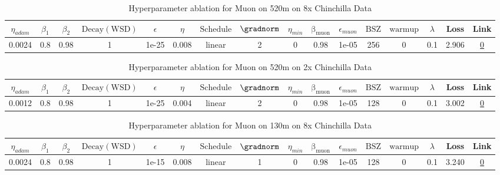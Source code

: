\begin{table}[H]
\centering
\caption{Hyperparameter ablation for Muon on 520m on 8x Chinchilla Data}
\label{tab:ablation_muon_520m_8}
\begin{tabular}{cccccccccccccccc}
\toprule
$\eta_{adam}$ & $\beta_1$ & $\beta_2$ & $\mathrm{Decay (WSD)}$ & $\epsilon$ & $\eta$ & $\mathrm{Schedule}$ & $\gradnorm$ & $\eta_{min}$ & $\mathrm{\beta_{muon}}$ & $\epsilon_{muon}$ & $\mathrm{BSZ}$ & $\mathrm{warmup}$ & $\lambda$ & Loss & Link \\
\midrule
0.0024 & 0.8 & 0.98 & 1 & 1e-25 & 0.008 & linear & 2 & 0 & 0.98 & 1e-05 & 256 & 0 & 0.1 & 2.906 & \href{https://wandb.ai/stanford-mercury/optimizer-scaling/runs/sweep-520m-85B-muongc58c06lr0.008-wd0.1-minlr0-warmup0-b10.8-b20-498482}{0} \\
\midrule
\bottomrule
\end{tabular}
\end{table}

\begin{table}[H]
\centering
\caption{Hyperparameter ablation for Muon on 520m on 2x Chinchilla Data}
\label{tab:ablation_muon_520m_2}
\begin{tabular}{cccccccccccccccc}
\toprule
$\eta_{adam}$ & $\beta_1$ & $\beta_2$ & $\mathrm{Decay (WSD)}$ & $\epsilon$ & $\eta$ & $\mathrm{Schedule}$ & $\gradnorm$ & $\eta_{min}$ & $\mathrm{\beta_{muon}}$ & $\epsilon_{muon}$ & $\mathrm{BSZ}$ & $\mathrm{warmup}$ & $\lambda$ & Loss & Link \\
\midrule
0.0012 & 0.8 & 0.98 & 1 & 1e-25 & 0.004 & linear & 2 & 0 & 0.98 & 1e-05 & 128 & 0 & 0.1 & 3.002 & \href{https://wandb.ai/stanford-mercury/optimizer-scaling/runs/sweep-520m-21B-muon7ace6clr0.004-wd0.1-minlr0-warmup0-b10.8-b20.-748517}{0} \\
\midrule
\bottomrule
\end{tabular}
\end{table}

\begin{table}[H]
\centering
\caption{Hyperparameter ablation for Muon on 130m on 8x Chinchilla Data}
\label{tab:ablation_muon_130m_8}
\begin{tabular}{cccccccccccccccc}
\toprule
$\eta_{adam}$ & $\beta_1$ & $\beta_2$ & $\mathrm{Decay (WSD)}$ & $\epsilon$ & $\eta$ & $\mathrm{Schedule}$ & $\gradnorm$ & $\eta_{min}$ & $\mathrm{\beta_{muon}}$ & $\epsilon_{muon}$ & $\mathrm{BSZ}$ & $\mathrm{warmup}$ & $\lambda$ & Loss & Link \\
\midrule
0.0024 & 0.8 & 0.98 & 1 & 1e-15 & 0.008 & linear & 1 & 0 & 0.98 & 1e-05 & 128 & 0 & 0.1 & 3.240 & \href{https://wandb.ai/stanford-mercury/optimizer-scaling/runs/sweep-130m-21B-muon9841d7lr0.008-wd0.1-minlr0-warmup0-b10.8-b20.-6269f2}{0} \\
\midrule
\bottomrule
\end{tabular}
\end{table}

